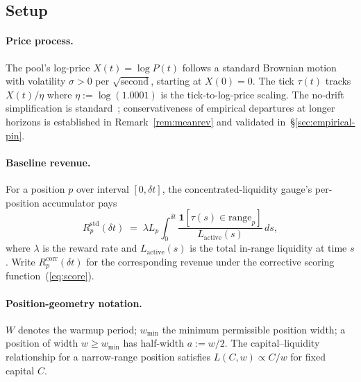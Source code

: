 \documentclass[11pt,a4paper]{article}
\theoremstyle{cgdefinition}
\theoremstyle{cgplain}
\theoremstyle{cgremark}
\begin{document}
\subsection{Setup}\label{sec:setup}

\paragraph{Price process.} The pool's log-price $X(t) = \log P(t)$ follows a standard Brownian motion with volatility $\sigma > 0$ per $\sqrt{\text{second}}$, starting at $X(0) = 0$. The tick $\tau(t)$ tracks $X(t)/\eta$ where $\eta := \log(1.0001)$ is the tick-to-log-price scaling. The no-drift simplification is standard~\cite{milionis2022b}; conservativeness of empirical departures at longer horizons is established in Remark~\ref{rem:meanrev} and validated in~\S\ref{sec:empirical-pin}.

\paragraph{Baseline revenue.} For a position $p$ over interval $[0, \delta t]$, the concentrated-liquidity gauge's per-position accumulator pays
\[
R^{\text{std}}_p(\delta t) \;=\; \lambda L_p \int_0^{\delta t} \frac{\mathbf{1}[\tau(s) \in \text{range}_p]}{L_{\text{active}}(s)}\,ds,
\]
where $\lambda$ is the reward rate and $L_{\text{active}}(s)$ is the total in-range liquidity at time $s$. Write $R^{\text{corr}}_p(\delta t)$ for the corresponding revenue under the corrective scoring function~(\ref{eq:score}).

\paragraph{Position-geometry notation.} $W$ denotes the warmup period; $w_{\min}$ the minimum permissible position width; a position of width $w \geq w_{\min}$ has half-width $a := w/2$. The capital--liquidity relationship for a narrow-range position satisfies $L(C, w) \propto C/w$ for fixed capital $C$.
\end{document}
